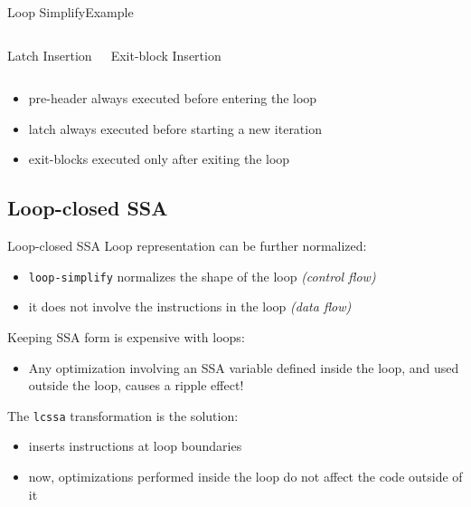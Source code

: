 \begin{frame}{Loop Simplify}{Example}
\vspace{-1.5em}
\begin{columns}[t]
\begin{block}{Latch Insertion}
\centering

\end{block}

\begin{block}{Exit-block Insertion}
\centering

\end{block}
\end{columns}
\bigskip
\begin{itemize}
\item pre-header always executed before entering the loop
\item latch always executed before starting a new iteration
\item exit-blocks executed only after exiting the loop
\end{itemize}
\end{frame}


\subsection{Loop-closed SSA}


\begin{frame}{Loop-closed SSA}
Loop representation can be further normalized:

\begin{itemize}
\item \texttt{loop-simplify} normalizes the \alert{shape} of the loop \emph{(control flow)}
\item it does not involve the instructions in the loop \emph{(data flow)}
\end{itemize}

\vfill
Keeping SSA form is expensive with loops:
\begin{itemize}
\item Any optimization involving an SSA variable \alert{defined inside the loop}, and \alert{used
outside the loop}, causes a ripple effect!
\end{itemize}
\vfill
The \texttt{lcssa} transformation is the solution:
\begin{itemize}
\item inserts  instructions at loop boundaries
\item now, optimizations performed inside the loop do not affect the code outside of it
\end{itemize}
\end{frame}


